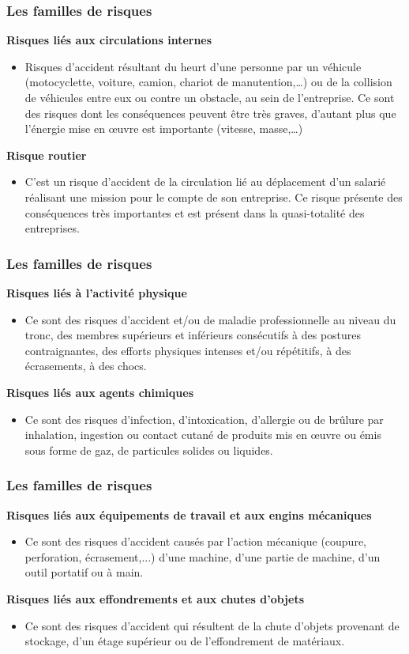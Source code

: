 \documentclass{beamer}
\begin{document}
\begin{frame}
\frametitle{Les familles de risques}
\textbf{Risques liés aux circulations internes}
\begin{itemize}
\item Risques d’accident résultant du heurt d’une personne par un véhicule (motocyclette, voiture, camion, chariot de manutention,…) ou de la collision de véhicules entre eux ou contre un obstacle, au sein de l’entreprise. Ce sont des risques dont les conséquences peuvent être très graves, d’autant plus que l’énergie mise en œuvre est importante (vitesse, masse,…)
\end{itemize}
\textbf{Risque routier}
\begin{itemize}
\item C’est un risque d’accident de la circulation lié au déplacement d’un salarié réalisant une mission pour le compte de son entreprise. Ce risque présente des conséquences très importantes et est présent dans la quasi-totalité des entreprises.
\end{itemize}
\end{frame}

\begin{frame}
\frametitle{Les familles de risques}
\textbf{Risques liés à l’activité physique}
\begin{itemize}
\item  Ce sont des risques d’accident et/ou de maladie professionnelle au niveau du tronc, des membres supérieurs et inférieurs consécutifs à des postures contraignantes, des efforts physiques intenses et/ou répétitifs, à des écrasements, à des chocs.
\end{itemize}
\textbf{Risques liés aux agents chimiques}
\begin{itemize}
\item Ce sont des risques d’infection, d’intoxication, d’allergie ou de brûlure par inhalation, ingestion ou contact cutané de produits mis en œuvre ou émis sous forme de gaz, de particules solides ou liquides.
\end{itemize}
\end{frame}

\begin{frame}
\frametitle{Les familles de risques}
\textbf{Risques liés aux équipements de travail et aux engins mécaniques}
\begin{itemize}
\item Ce sont des risques d’accident causés par l’action mécanique (coupure, perforation, écrasement,...) d’une machine, d’une partie de machine, d’un outil portatif ou à main.
\end{itemize}
\textbf{Risques liés aux effondrements et aux chutes d’objets}
\begin{itemize}
\item Ce sont des risques d’accident qui résultent de la chute d’objets provenant de stockage, d’un étage supérieur ou de l’effondrement de matériaux.
\end{itemize}
\end{frame}
\end{document}
